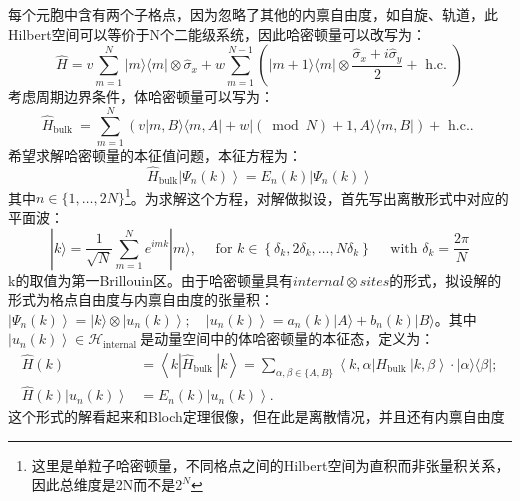 \documentclass[12pt, a4paper, oneside]{ctexbook}
\begin{document}
每个元胞中含有两个子格点，因为忽略了其他的内禀自由度，如自旋、轨道，此Hilbert空间可以等价于N个二能级系统，因此哈密顿量可以改写为：
\begin{equation}
	\hat{H}=v \sum_{m=1}^N|m\rangle\langle m| \otimes \hat{\sigma}_x+w \sum_{m=1}^{N-1}\left(|m+1\rangle\langle m| \otimes \frac{\hat{\sigma}_x+i \hat{\sigma}_y}{2}+\text { h.c. }\right)
\end{equation}
考虑周期边界条件，体哈密顿量可以写为：
\begin{equation}
	\hat{H}_{\text {bulk }}=\sum_{m=1}^N(v|m, B\rangle\langle m, A|+w|(\bmod N)+1, A\rangle\langle m, B|)+\text { h.c.. }
\end{equation} 
希望求解哈密顿量的本征值问题，本征方程为：
\begin{equation}
	\hat{H}_{\mathrm{bulk}}\left|\Psi_n(k)\right\rangle=E_n(k)\left|\Psi_n(k)\right\rangle
\end{equation}
其中$ n \in\{1, \ldots, 2 N\} $\footnote{这里是单粒子哈密顿量，不同格点之间的Hilbert空间为直积而非张量积关系，因此总维度是2N而不是$ 2^N $ }。为求解这个方程，对解做拟设，首先写出离散形式中对应的平面波：
\begin{equation}
	|k\rangle=\frac{1}{\sqrt{N}} \sum_{m=1}^N e^{i m k}|m\rangle, \quad \text { for } k \in\left\{\delta_k, 2 \delta_k, \ldots, N \delta_k\right\} \quad \text { with } \delta_k=\frac{2 \pi}{N}
\end{equation} 
k的取值为第一Brillouin区。由于哈密顿量具有$ internal\otimes sites $的形式，拟设解的形式为格点自由度与内禀自由度的张量积：$ \left|\Psi_n(k)\right\rangle=|k\rangle \otimes\left|u_n(k)\right\rangle ; \quad\left|u_n(k)\right\rangle=a_n(k)|A\rangle+b_n(k)|B\rangle $。其中$ \left|u_n(k)\right\rangle \in \mathscr{H}_{\text {internal }} $是动量空间中的体哈密顿量的本征态，定义为：
\begin{equation}
	\begin{aligned}
		\hat{H}(k) & =\left\langle k\left|\hat{H}_{\text {bulk }}\right| k\right\rangle=\sum_{\alpha, \beta \in\{A, B\}}\left\langle k, \alpha\left|H_{\text {bulk }}\right| k, \beta\right\rangle \cdot|\alpha\rangle\langle\beta| ; \\
		\hat{H}(k)\left|u_n(k)\right\rangle & =E_n(k)\left|u_n(k)\right\rangle .
		\end{aligned}
\end{equation} 
这个形式的解看起来和Bloch定理很像，但在此是离散情况，并且还有内禀自由度
\end{document}

